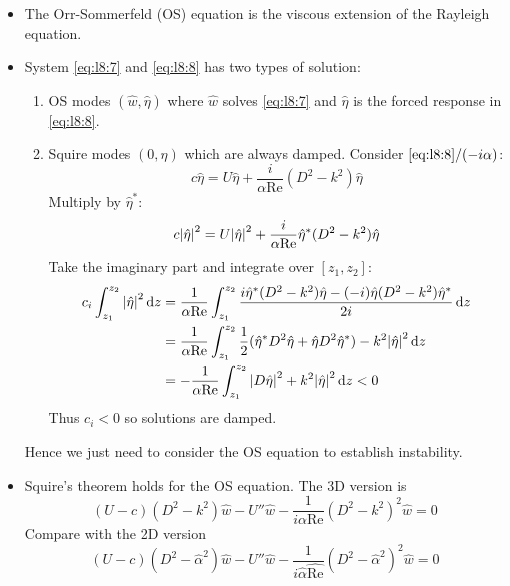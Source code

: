\documentclass{jknotes}
\newcommand{\ReN}{\text{Re}}
\newcommand{\zint}{\int_{z_1}^{z_2}}
\begin{document}
\begin{itemize}
	\item The Orr-Sommerfeld (OS) equation is the viscous extension of the
		Rayleigh equation.
	\item System \eqref{eq:l8:7} and \eqref{eq:l8:8} has two types of
		solution:
		\begin{enumerate}
			\item OS modes $(\hat{w},\hat{\eta})$ where $\hat{w}$ solves
			\eqref{eq:l8:7} and $\hat{\eta}$ is the forced response in
			\eqref{eq:l8:8}.
		\item Squire modes $(0, \hat{\eta})$ which are always damped. Consider
			$\eqref{eq:l8:8}/(-i\alpha)$:
			\begin{equation}
				c \hat{\eta} = U \hat{\eta} + \frac{i}{\alpha \ReN}
				(D^2-k^2)\hat{\eta} 
			\end{equation}
			Multiply by $\hat{\eta}^*$:
			\begin{equation}
				c \abs{\hat{\eta}}^2 = U \abs{\hat{\eta}}^2 + \frac{i}{\alpha \ReN}
				\hat{\eta}^*(D^2-k^2)\hat{\eta} 
			\end{equation}
			Take the imaginary part and integrate over $\left[z_1,z_2\right]$:
			\begin{align}
				c_i \zint \abs{\hat{\eta}}^2 \, \diffd z 
				&= \frac{1}{\alpha
					\ReN} \zint \frac{i\hat{\eta}^*(D^2-k^2)\hat{\eta} - 
				(-i)\hat{\eta}(D^2-k^2)\hat{\eta}^*}{2i} \, \diffd z \\
				&= \frac{1}{\alpha \ReN}\zint \frac{1}{2}( 
				\hat{\eta}^*D^2\hat{\eta} + \hat{\eta} D^2
				\hat{\eta}^*) - k^2 \abs{\hat{\eta}}^2 \, \diffd z \\
				&= -\frac{1}{\alpha \ReN} \zint \abs{D \hat{\eta}}^2 + k^2
				\abs{\hat{\eta}}^2 \, \diffd z < 0
			\end{align}
			Thus $c_i < 0$ so solutions are damped. 			
		\end{enumerate}
		Hence we just need to consider  the OS equation to establish instability.
	\item Squire's theorem holds for the OS equation. The 3D version is
		\begin{equation}
			(U-c)(D^2 -k^2) \hat{w} - U'' \hat{w} - \frac{1}{i\alpha
			\ReN}(D^2-k^2)^2 \hat{w} = 0
		\end{equation}
		Compare with the 2D version
		\begin{equation}
			(U-c)(D^2 -\hat{\alpha}^2) \hat{w} - U'' \hat{w} -
			\frac{1}{i\hat{\alpha}\hat{\ReN}}(D^2-\hat{\alpha}^2)^2 \hat{w} = 0
		\end{equation}

\end{itemize}
\end{document}
